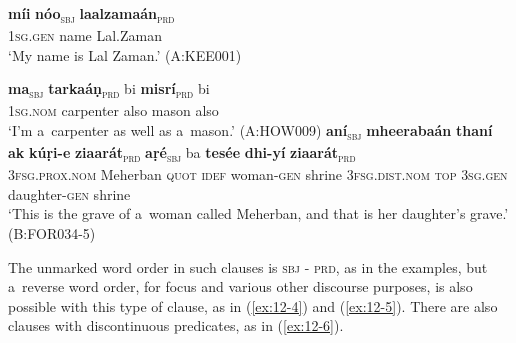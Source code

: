 \begin{exe}
\ex
\label{ex:12-1}
\gll {\ob}\textbf{míi} \textbf{nóo}{\cb}\textsubscript{\textsc{\upshape sbj}} {\ob}\textbf{laalzamaán}{\cb}\textsubscript{\textsc{\upshape prd}}\\
\textsc{1sg.gen} name Lal.Zaman\\
\glt `My name is Lal Zaman.' (A:KEE001)

\ex
\label{ex:12-2}
\gll {\ob}\textbf{ma}{\cb}\textsubscript{\textsc{\upshape sbj}} {\ob}\textbf{tarkaáṇ}{\cb}\textsubscript{\textsc{\upshape prd}} bi
     {\ob}\textbf{misrí}{\cb}\textsubscript{\textsc{\upshape prd}} bi \\
\textsc{1sg.nom} carpenter also mason also  \\
\glt `I'm a~carpenter as well as a~mason.' (A:HOW009)
\ex
\label{ex:12-3}
\gll {\ob}\textbf{aní}{\cb}\textsubscript{\textsc{\upshape sbj}} {\ob}\textbf{mheerabaán} \textbf{thaní} \textbf{ak} \textbf{kúṛi-e} \textbf{ziaarát}{\cb}\textsubscript{\textsc{\upshape prd}} {\ob}\textbf{aṛé}{\cb}\textsubscript{\textsc{\upshape sbj}} ba {\ob}\textbf{tesée} \textbf{dhi-yí} \textbf{ziaarát}{\cb}\textsubscript{\textsc{\upshape prd}}\\
\textsc{3fsg.prox.nom} Meherban \textsc{quot} \textsc{idef} woman-\textsc{gen}  shrine \textsc{3fsg.dist.nom} \textsc{top} \textsc{3sg.gen} daughter-\textsc{gen}  shrine \\
\glt `This is the grave of a~woman called Meherban, and that is her daughter's grave.' (B:FOR034-5)
\end{exe}

The unmarked word order in such clauses is \textsc{sbj - prd}, as in the examples, but a~reverse word order, for focus and various other discourse purposes, is also possible with this type of clause, as in (\ref{ex:12-4}) and (\ref{ex:12-5}). There are also clauses with discontinuous predicates, as in (\ref{ex:12-6}).

